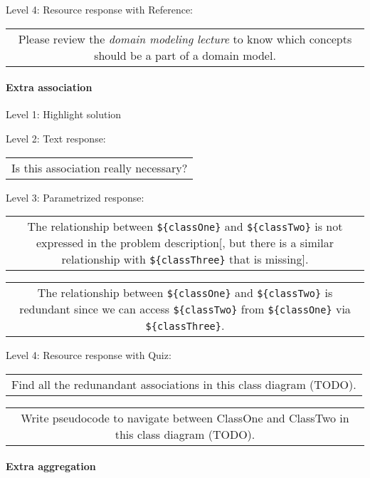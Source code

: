 \noindent Level 4: Resource response with Reference:

\begin{tabular}{|c}
Please review the \textit{domain modeling lecture} to know which concepts should be a part of a domain model.
\end{tabular} \medskip


\paragraph{Extra association}

\noindent Level 1: Highlight solution \medskip

\noindent Level 2: Text response: \medskip

\begin{tabular}{|c}
Is this association really necessary?
\end{tabular} \medskip

\noindent Level 3: Parametrized response: \medskip

\begin{tabular}{|c}
The relationship between \verb|${classOne}| and \verb|${classTwo}| is not expressed in the problem description[, but there is a similar relationship with \verb|${classThree}| that is missing].
\end{tabular} \medskip

\begin{tabular}{|c}
The relationship between \verb|${classOne}| and \verb|${classTwo}| is redundant since we can access \verb|${classTwo}| from \verb|${classOne}| via \verb|${classThree}|.
\end{tabular} \medskip

\noindent Level 4: Resource response with Quiz:

\begin{tabular}{|c}
Find all the redunandant associations in this class diagram (TODO).
\end{tabular} \medskip



\begin{tabular}{|c}
Write pseudocode to navigate between ClassOne and ClassTwo in this class diagram (TODO).
\end{tabular} \medskip


\paragraph{Extra aggregation}

